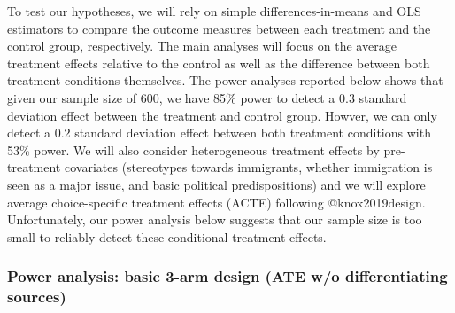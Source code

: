 \documentclass[
]{article}
\begin{document}
To test our hypotheses, we will rely on simple differences-in-means and
OLS estimators to compare the outcome measures between each treatment
and the control group, respectively. The main analyses will focus on the
average treatment effects relative to the control as well as the
difference between both treatment conditions themselves. The power
analyses reported below shows that given our sample size of 600, we have
85\% power to detect a 0.3 standard deviation effect between the
treatment and control group. Howver, we can only detect a 0.2 standard
deviation effect between both treatment conditions with 53\% power. We
will also consider heterogeneous treatment effects by pre-treatment
covariates (stereotypes towards immigrants, whether immigration is seen
as a major issue, and basic political predispositions) and we will
explore average choice-specific treatment effects (ACTE) following
@knox2019design. Unfortunately, our power analysis below suggests that
our sample size is too small to reliably detect these conditional
treatment effects.

\hypertarget{power-analysis-basic-3-arm-design-ate-wo-differentiating-sources}{%
\subsubsection{Power analysis: basic 3-arm design (ATE w/o
differentiating
sources)}\label{power-analysis-basic-3-arm-design-ate-wo-differentiating-sources}}
\end{document}

